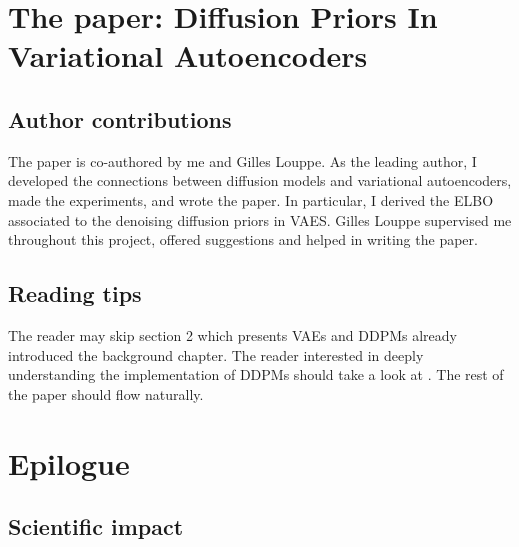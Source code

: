 \section{The paper: Diffusion Priors In Variational Autoencoders}

\subsection{Author contributions}
The paper is co-authored by me and Gilles Louppe. As the leading author, I developed the connections between diffusion models and variational autoencoders, made the experiments, and wrote the paper. In particular, I derived the ELBO associated to the denoising diffusion priors in VAES. Gilles Louppe supervised me throughout this project, offered suggestions and helped in writing the paper.

\subsection{Reading tips}
The reader may skip section 2 which presents VAEs and DDPMs already introduced the background chapter. The reader interested in deeply understanding the implementation of DDPMs should take a look at \citet{ho_denoising_2020}. The rest of the paper should flow naturally.




\section{Epilogue}
\subsection{Scientific impact}

